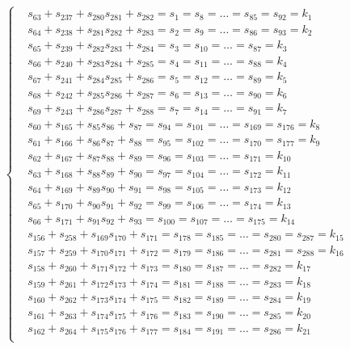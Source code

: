 \begin{equation}
\left\{
\begin{aligned}
&s_{63}+s_{237}+s_{280}s_{281}+s_{282}=s_{1}=s_{8}=\ldots=s_{85}=s_{92}=k_{1}\\
&s_{64}+s_{238}+s_{281}s_{282}+s_{283}=s_{2}=s_{9}=\ldots=s_{86}=s_{93}=k_{2}\\
&s_{65}+s_{239}+s_{282}s_{283}+s_{284}=s_{3}=s_{10}=\ldots=s_{87}=k_{3}\\
&s_{66}+s_{240}+s_{283}s_{284}+s_{285}=s_{4}=s_{11}=\ldots=s_{88}=k_{4}\\
&s_{67}+s_{241}+s_{284}s_{285}+s_{286}=s_{5}=s_{12}=\ldots=s_{89}=k_{5}\\
&s_{68}+s_{242}+s_{285}s_{286}+s_{287}=s_{6}=s_{13}=\ldots=s_{90}=k_{6}\\
&s_{69}+s_{243}+s_{286}s_{287}+s_{288}=s_{7}=s_{14}=\ldots=s_{91}=k_{7}\\
&s_{60}+s_{165}+s_{85}s_{86}+s_{87}=s_{94}=s_{101}=\ldots=s_{169}=s_{176}=k_{8}\\
&s_{61}+s_{166}+s_{86}s_{87}+s_{88}=s_{95}=s_{102}=\ldots=s_{170}=s_{177}=k_{9}\\
&s_{62}+s_{167}+s_{87}s_{88}+s_{89}=s_{96}=s_{103}=\ldots=s_{171}=k_{10}\\
&s_{63}+s_{168}+s_{88}s_{89}+s_{90}=s_{97}=s_{104}=\ldots=s_{172}=k_{11}\\
&s_{64}+s_{169}+s_{89}s_{90}+s_{91}=s_{98}=s_{105}=\ldots=s_{173}=k_{12}\\
&s_{65}+s_{170}+s_{90}s_{91}+s_{92}=s_{99}=s_{106}=\ldots=s_{174}=k_{13}\\
&s_{66}+s_{171}+s_{91}s_{92}+s_{93}=s_{100}=s_{107}=\ldots=s_{175}=k_{14}\\
&s_{156}+s_{258}+s_{169}s_{170}+s_{171}=s_{178}=s_{185}=\ldots=s_{280}=s_{287}=k_{15}\\
&s_{157}+s_{259}+s_{170}s_{171}+s_{172}=s_{179}=s_{186}=\ldots=s_{281}=s_{288}=k_{16}\\
&s_{158}+s_{260}+s_{171}s_{172}+s_{173}=s_{180}=s_{187}=\ldots=s_{282}=k_{17}\\
&s_{159}+s_{261}+s_{172}s_{173}+s_{174}=s_{181}=s_{188}=\ldots=s_{283}=k_{18}\\
&s_{160}+s_{262}+s_{173}s_{174}+s_{175}=s_{182}=s_{189}=\ldots=s_{284}=k_{19}\\
&s_{161}+s_{263}+s_{174}s_{175}+s_{176}=s_{183}=s_{190}=\ldots=s_{285}=k_{20}\\
&s_{162}+s_{264}+s_{175}s_{176}+s_{177}=s_{184}=s_{191}=\ldots=s_{286}=k_{21}\\
\end{aligned}
\right.
\end{equation}

